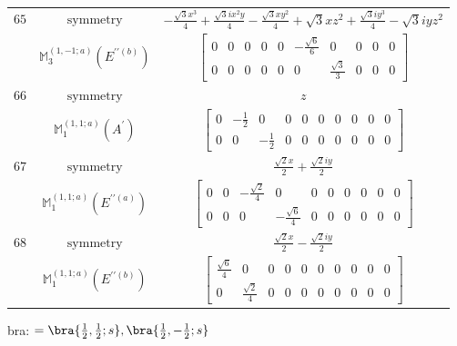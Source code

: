 \documentclass[fleqn,8pt,landscape]{jsarticle}
\begin{document}
\begin{longtable}{ccc}
$ 65 $ & $ \text{symmetry} $ & $ - \frac{\sqrt{3} x^{3}}{4} + \frac{\sqrt{3} i x^{2} y}{4} - \frac{\sqrt{3} x y^{2}}{4} + \sqrt{3} x z^{2} + \frac{\sqrt{3} i y^{3}}{4} - \sqrt{3} i y z^{2} $ \\
$  $ & $ \mathbb{M}_{3}^{(1,-1;a)}(E^{\prime\prime(b)}) $ & $ \begin{bmatrix} 0 & 0 & 0 & 0 & 0 & - \frac{\sqrt{6}}{6} & 0 & 0 & 0 & 0 \\ 0 & 0 & 0 & 0 & 0 & 0 & \frac{\sqrt{3}}{3} & 0 & 0 & 0 \end{bmatrix} $ \\ \hline
$ 66 $ & $ \text{symmetry} $ & $ z $ \\
$  $ & $ \mathbb{M}_{1}^{(1,1;a)}(A^{\prime}) $ & $ \begin{bmatrix} 0 & - \frac{1}{2} & 0 & 0 & 0 & 0 & 0 & 0 & 0 & 0 \\ 0 & 0 & - \frac{1}{2} & 0 & 0 & 0 & 0 & 0 & 0 & 0 \end{bmatrix} $ \\ \hline
$ 67 $ & $ \text{symmetry} $ & $ \frac{\sqrt{2} x}{2} + \frac{\sqrt{2} i y}{2} $ \\
$  $ & $ \mathbb{M}_{1}^{(1,1;a)}(E^{\prime\prime(a)}) $ & $ \begin{bmatrix} 0 & 0 & - \frac{\sqrt{2}}{4} & 0 & 0 & 0 & 0 & 0 & 0 & 0 \\ 0 & 0 & 0 & - \frac{\sqrt{6}}{4} & 0 & 0 & 0 & 0 & 0 & 0 \end{bmatrix} $ \\ \hline
$ 68 $ & $ \text{symmetry} $ & $ \frac{\sqrt{2} x}{2} - \frac{\sqrt{2} i y}{2} $ \\
$  $ & $ \mathbb{M}_{1}^{(1,1;a)}(E^{\prime\prime(b)}) $ & $ \begin{bmatrix} \frac{\sqrt{6}}{4} & 0 & 0 & 0 & 0 & 0 & 0 & 0 & 0 & 0 \\ 0 & \frac{\sqrt{2}}{4} & 0 & 0 & 0 & 0 & 0 & 0 & 0 & 0 \end{bmatrix} $ \\ \hline
\end{longtable}
bra: $=\bra{\frac{1}{2},\frac{1}{2};s}, \bra{\frac{1}{2},- \frac{1}{2};s}$
\end{document}
